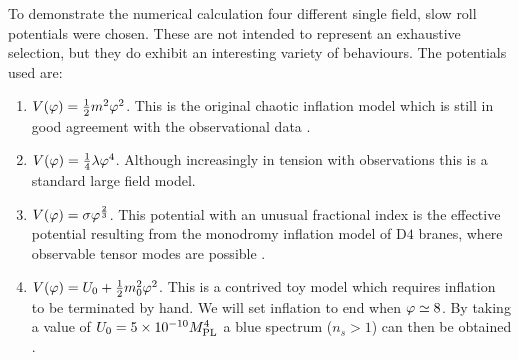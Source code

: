 To demonstrate the numerical calculation four different single field, slow roll
potentials were chosen. These are not intended to represent an exhaustive selection,
but they do exhibit an interesting variety of behaviours. The potentials used are:
% 
% 
\begin{enumerate}
% 
 \item $V(\varphi) = \frac{1}{2} m^2 \varphi^2$. This is the original chaotic inflation model which is
still in good agreement with the observational data \cite{Alabidi:2008ej}.
% 
 \item $V(\varphi) = \frac{1}{4}\lambda\varphi^4$. Although increasingly in tension with observations
 this is a standard large field model.
% 
 \item $V(\varphi) = \sigma\varphi^{\frac{2}{3}}$. This potential with an unusual fractional index
is the effective potential resulting from the monodromy inflation model of D$4$
branes, where observable tensor modes are possible \cite{Silverstein:2008sg,
Alabidi:2008ej}.
% 
 \item $V(\varphi) = U_0 + \frac{1}{2} m_0^2 \varphi^2$. This is a contrived toy model which requires inflation to
be terminated by hand. We will set inflation to end when $\varphi \simeq 8$. By taking a value
of $U_0 = 5\times 10^{-10}M_{\mathrm{PL}}^{4}$ a blue spectrum ($n_s>1$) can then be obtained
\cite{Linde:1993cn,Komatsu:2008hk}.
% 
\end{enumerate}
% 
% 
